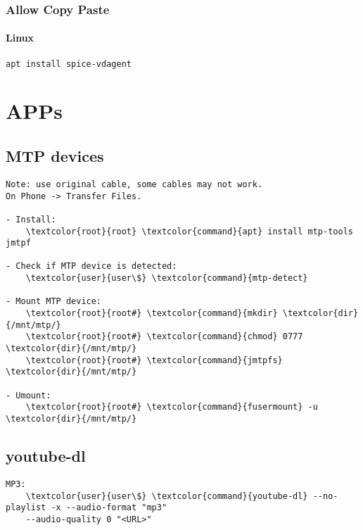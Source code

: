 \documentclass[10pt, a4paper, onecolumn, openany]{book} %
\begin{document}
\subsection{Allow Copy Paste}
\subsubsection{Linux}
\begin{Verbatim}[commandchars=\\\{\}]
apt install spice-vdagent
\end{Verbatim}




\chapter{APPs}
\section{MTP devices}
\begin{Verbatim}[commandchars=\\\{\}]
Note: use original cable, some cables may not work.
On Phone -> Transfer Files.

- Install:
    \textcolor{root}{root} \textcolor{command}{apt} install mtp-tools jmtpf

- Check if MTP device is detected:
    \textcolor{user}{user\$} \textcolor{command}{mtp-detect}

- Mount MTP device:
    \textcolor{root}{root#} \textcolor{command}{mkdir} \textcolor{dir}{/mnt/mtp/}
    \textcolor{root}{root#} \textcolor{command}{chmod} 0777 \textcolor{dir}{/mnt/mtp/}
    \textcolor{root}{root#} \textcolor{command}{jmtpfs} \textcolor{dir}{/mnt/mtp/}
    
- Umount:
    \textcolor{root}{root#} \textcolor{command}{fusermount} -u \textcolor{dir}{/mnt/mtp/}
\end{Verbatim}

\section{youtube-dl}
\begin{Verbatim}[commandchars=\\\{\}]
MP3:
    \textcolor{user}{user\$} \textcolor{command}{youtube-dl} --no-playlist -x --audio-format "mp3" 
    --audio-quality 0 "<URL>"
\end{Verbatim}
\end{document}
